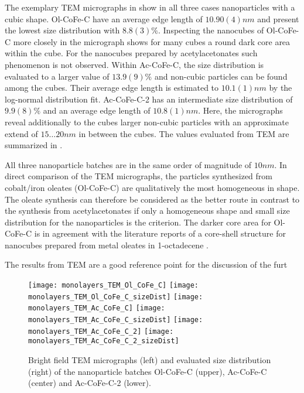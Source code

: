 \documentclass[\main/dresen_thesis.tex]{subfiles}
\begin{document}
  \label{sec:monolayers:nanoparticle:tem}
  The exemplary TEM micrographs in  show in all three cases nanoparticles with a cubic shape.
  Ol-CoFe-C have an average edge length of $10.90(4) \unit{nm}$ and present the lowest size distribution with $8.8(3) \unit{\%}$.
  Inspecting the nanocubes of Ol-CoFe-C more closely in the micrograph shows for many cubes a round dark core area within the cube.
  For the nanocubes prepared by acetylacetonates such phenomenon is not observed.
  Within Ac-CoFe-C, the size distribution is evaluated to a larger value of $13.9(9) \unit{\%}$ and non-cubic particles can be found among the cubes.
  Their average edge length is estimated to $10.1(1) \unit{nm}$ by the log-normal distribution fit.
  Ac-CoFe-C-2 has an intermediate size distribution of $9.9(8) \%$ and an average edge length of $10.8(1) \unit{nm}$.
  Here, the micrographs reveal additionally to the cubes larger non-cubic particles with an approximate extend of $15 \ldots 20 \unit{nm}$ in between the cubes.
  The values evaluated from TEM are summarized in .

  All three nanoparticle batches are in the same order of magnitude of $10 \unit{nm}$.
  In direct comparison of the TEM micrographs, the particles synthesized from cobalt/iron oleates (Ol-CoFe-C) are qualitatively the most homogeneous in shape.
  The oleate synthesis can therefore be considered as the better route in contrast to the synthesis from acetylacetonates  if only a homogeneous shape and small size distribution for the nanoparticles is the criterion.
  The darker core area for Ol-CoFe-C is in agreement with the literature reports of a core-shell structure for nanocubes prepared from metal oleates in 1-octadecene \cite{Bao_2009_Forma, Bodnarchuk_2009_Excha, Wetterskog_2013_Anoma}.

  The results from TEM are a good reference point for the discussion of the furt

  \begin{figure}[tb]
    \centering
    \texttt{[image: monolayers\_TEM\_Ol\_CoFe\_C]}
    \texttt{[image: monolayers\_TEM\_Ol\_CoFe\_C\_sizeDist]}
    \texttt{[image: monolayers\_TEM\_Ac\_CoFe\_C]}
    \texttt{[image: monolayers\_TEM\_Ac\_CoFe\_C\_sizeDist]}
    \texttt{[image: monolayers\_TEM\_Ac\_CoFe\_C\_2]}
    \texttt{[image: monolayers\_TEM\_Ac\_CoFe\_C\_2\_sizeDist]}
    \caption{\label{fig:monolayers:nanoparticle:tem}Bright field TEM micrographs (left) and evaluated size distribution (right) of the nanoparticle batches Ol-CoFe-C (upper), Ac-CoFe-C (center) and Ac-CoFe-C-2 (lower).}
  \end{figure}
\end{document}
